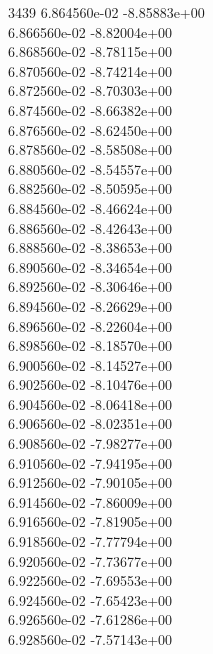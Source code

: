 3439	6.864560e-02	-8.85883e+00	\\ 	6.866560e-02	-8.82004e+00	\\ 	6.868560e-02	-8.78115e+00	\\ 	6.870560e-02	-8.74214e+00	\\ 	6.872560e-02	-8.70303e+00	\\ 	6.874560e-02	-8.66382e+00	\\ 	6.876560e-02	-8.62450e+00	\\ 	6.878560e-02	-8.58508e+00	\\ 	6.880560e-02	-8.54557e+00	\\ 	6.882560e-02	-8.50595e+00	\\ 	6.884560e-02	-8.46624e+00	\\ 	6.886560e-02	-8.42643e+00	\\ 	6.888560e-02	-8.38653e+00	\\ 	6.890560e-02	-8.34654e+00	\\ 	6.892560e-02	-8.30646e+00	\\ 	6.894560e-02	-8.26629e+00	\\ 	6.896560e-02	-8.22604e+00	\\ 	6.898560e-02	-8.18570e+00	\\ 	6.900560e-02	-8.14527e+00	\\ 	6.902560e-02	-8.10476e+00	\\ 	6.904560e-02	-8.06418e+00	\\ 	6.906560e-02	-8.02351e+00	\\ 	6.908560e-02	-7.98277e+00	\\ 	6.910560e-02	-7.94195e+00	\\ 	6.912560e-02	-7.90105e+00	\\ 	6.914560e-02	-7.86009e+00	\\ 	6.916560e-02	-7.81905e+00	\\ 	6.918560e-02	-7.77794e+00	\\ 	6.920560e-02	-7.73677e+00	\\ 	6.922560e-02	-7.69553e+00	\\ 	6.924560e-02	-7.65423e+00	\\ 	6.926560e-02	-7.61286e+00	\\ 	6.928560e-02	-7.57143e+00	\\ \hline
